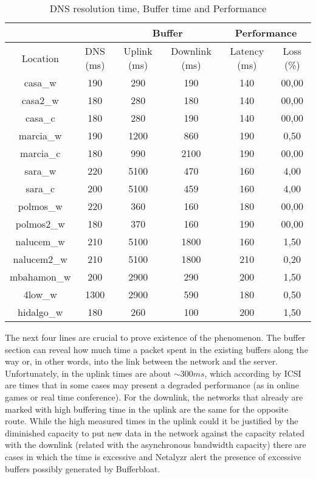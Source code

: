\begin{table}[ht]
\begin{center}
\begin{tabular}{|c||c||c|c||c|c||}
 \hline
& & \multicolumn{2}{|c||}{Buffer} & \multicolumn{2}{|c||}{Performance} \\ \hline
Location	& DNS (ms) 	& Uplink (ms)	& Downlink (ms) & Latency (ms)	& Loss (\%) \\ \hline \hline
casa\_w		& 190		& 290			& 190 			& 140			& 00,00		\\ \hline
casa2\_w	& 180		& 280			& 180 			& 140			& 00,00		\\ \hline
casa\_c		& 180		& 280			& 190			& 140			& 00,00		\\ \hline
marcia\_w	& 190		& 1200			& 860			& 190			& 0,50 		\\ \hline
marcia\_c	& 180		& 990			& 2100			& 190			& 00,00		\\ \hline
sara\_w		& 220		& 5100			& 470			& 160			& 4,00 		\\ \hline
sara\_c		& 200		& 5100			& 459			& 160			& 4,00 		\\ \hline
polmos\_w	& 220		& 360			& 160			& 180			& 00,00		\\ \hline
polmos2\_w	& 180		& 370			& 160			& 190			& 00,00		\\ \hline
nalucem\_w	& 210		& 5100			& 1800			& 160			& 1,50 		\\ \hline
nalucem2\_w	& 210		& 5100			& 1800			& 210			& 0,20 		\\ \hline
mbahamon\_w	& 200		& 2900			& 290			& 200			& 1,50 		\\ \hline
4low\_w		& 1300		& 2900			& 590			& 180			& 0,50 		\\ \hline
hidalgo\_w	& 180		& 260			& 100			& 200			& 1,50 		\\ \hline
\end{tabular}
\caption[Netalyzr Test:DNS resolution time, Buffer time and Performance]{DNS resolution time, Buffer time and Performance}
\label{table:buffer}
\end{center}
\end{table}

The next four lines are crucial to prove existence of the phenomenon. The
buffer section can reveal how much time a packet spent in the existing buffers
along the way or, in other words, into the link between the network and the
server. Unfortunately, in the uplink times are about $\sim300ms$, which
according by ICSI are times that in some cases may present a degraded
performance (as in online games or real time conference). For the downlink,
the networks that already are marked with high buffering time in the uplink
are the same for the opposite route. While the high measured times in the
uplink could it be justified by the diminished capacity to put new data in the
network against the capacity related with the downlink (related with the
asynchronous bandwidth capacity) there are cases in which the time is
excessive and Netalyzr alert the presence of excessive buffers possibly
generated by Bufferbloat.

